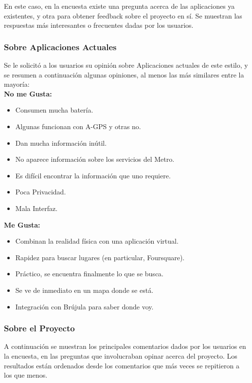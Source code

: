 \documentclass[10pt,letterpaper]{article}
\begin{document}
En este caso, en la encuesta existe una pregunta acerca de las aplicaciones ya existentes, y otra para obtener feedback sobre el proyecto en sí. Se muestran las respuestas más interesantes o frecuentes dadas por los usuarios.\\

\subsubsection{Sobre Aplicaciones Actuales}

Se le solicitó a los usuarios su opinión sobre Aplicaciones actuales de este estilo, y se resumen a continuación algunas opiniones, al menos las más similares entre la mayoría:\\

\textbf{No me Gusta:}\\

\begin{itemize}
\item Consumen mucha batería.
\item Algunas funcionan con A-GPS y otras no.
\item Dan mucha información inútil.
\item No aparece información sobre los servicios del Metro.
\item Es difícil encontrar la información que uno requiere.
\item Poca Privacidad.
\item Mala Interfaz.
\end{itemize}

\textbf{Me Gusta:}\\

\begin{itemize}
\item Combinan la realidad física con una aplicación virtual.
\item Rapidez para buscar lugares (en particular, Foursquare).
\item Práctico, se encuentra finalmente lo que se busca.
\item Se ve de inmediato en un mapa donde se está.
\item Integración con Brújula para saber donde voy.
\end{itemize}

\subsubsection{Sobre el Proyecto}

A continuación se muestran los principales comentarios dados por los usuarios en la encuesta, en las preguntas que involucraban opinar acerca del proyecto. Los resultados están ordenados desde los comentarios que más veces se repitieron a los que menos.\\
\end{document}
